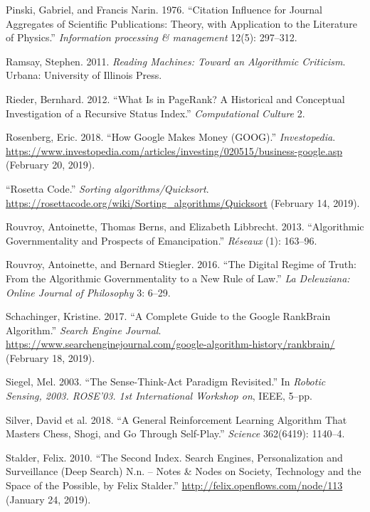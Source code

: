 \documentclass[12pt,twoside]{report}
\begin{document}
\leavevmode\hypertarget{ref-Pinski1976}{}%
Pinski, Gabriel, and Francis Narin. 1976. ``Citation Influence for Journal Aggregates of Scientific Publications: Theory, with Application to the Literature of Physics.'' \emph{Information processing \& management} 12(5): 297--312.

\leavevmode\hypertarget{ref-Ramsay2011}{}%
Ramsay, Stephen. 2011. \emph{Reading Machines: Toward an Algorithmic Criticism}. Urbana: University of Illinois Press.

\leavevmode\hypertarget{ref-Rieder2012}{}%
Rieder, Bernhard. 2012. ``What Is in PageRank? A Historical and Conceptual Investigation of a Recursive Status Index.'' \emph{Computational Culture} 2.

\leavevmode\hypertarget{ref-Rosenberg2018}{}%
Rosenberg, Eric. 2018. ``How Google Makes Money (GOOG).'' \emph{Investopedia}. \url{https://www.investopedia.com/articles/investing/020515/business-google.asp} (February 20, 2019).

\leavevmode\hypertarget{ref-Rosetta2019}{}%
``Rosetta Code.'' \emph{Sorting algorithms/Quicksort}. \url{https://rosettacode.org/wiki/Sorting_algorithms/Quicksort} (February 14, 2019).

\leavevmode\hypertarget{ref-Rouvroy2013}{}%
Rouvroy, Antoinette, Thomas Berns, and Elizabeth Libbrecht. 2013. ``Algorithmic Governmentality and Prospects of Emancipation.'' \emph{Réseaux} (1): 163--96.

\leavevmode\hypertarget{ref-Rouvroy2016}{}%
Rouvroy, Antoinette, and Bernard Stiegler. 2016. ``The Digital Regime of Truth: From the Algorithmic Governmentality to a New Rule of Law.'' \emph{La Deleuziana: Online Journal of Philosophy} 3: 6--29.

\leavevmode\hypertarget{ref-Schachinger2017}{}%
Schachinger, Kristine. 2017. ``A Complete Guide to the Google RankBrain Algorithm.'' \emph{Search Engine Journal}. \url{https://www.searchenginejournal.com/google-algorithm-history/rankbrain/} (February 18, 2019).

\leavevmode\hypertarget{ref-Siegel2003}{}%
Siegel, Mel. 2003. ``The Sense-Think-Act Paradigm Revisited.'' In \emph{Robotic Sensing, 2003. ROSE'03. 1st International Workshop on}, IEEE, 5--pp.

\leavevmode\hypertarget{ref-Silver2018}{}%
Silver, David et al. 2018. ``A General Reinforcement Learning Algorithm That Masters Chess, Shogi, and Go Through Self-Play.'' \emph{Science} 362(6419): 1140--4.

\leavevmode\hypertarget{ref-Stalder2009}{}%
Stalder, Felix. 2010. ``The Second Index. Search Engines, Personalization and Surveillance (Deep Search) \textbar{} N.n. -- Notes \& Nodes on Society, Technology and the Space of the Possible, by Felix Stalder.'' \url{http://felix.openflows.com/node/113} (January 24, 2019).
\end{document}
